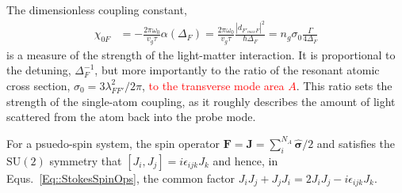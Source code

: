 \documentclass[preprint,aps,pra,onecolumn]{revtex4-1} %
\begin{document}
The dimensionless coupling constant,
\begin{align}
\chi_{0F} &= -\frac{2\pi\omega_0}{v_g\tau}\alpha(\Delta_F) =\frac{2\pi\omega_0}{v_g\tau} \frac{|d_{F'_{max}F}|^2}{\hbar \Delta_F} =n_g\sigma_0\frac{\Gamma}{4\Delta_F}
\end{align}
is a measure of the strength of the light-matter interaction.  It is proportional to the detuning, $\Delta_F^{-1}$, but more importantly to the ratio of the resonant atomic cross section, $\sigma_0 = 3 \lambda_{F F'}^2/2 \pi$, \textcolor{red}{to the transverse mode area $A$}.  This ratio sets the strength of the single-atom coupling, as it roughly describes the amount of light scattered from the atom back into the probe mode.  

For a psuedo-spin system, the spin operator 
$\mathbf{F}=\mathbf{J}=\sum_i^{N_A}\hat{\boldsymbol{\sigma}}/2$ and satisfies the $\mathrm{SU}(2)$ 
symmetry that $[J_i,J_j]=i\epsilon_{ijk}J_k$ and hence, in Equs.~\eqref{Eq::StokesSpinOps}, the common 
factor $J_iJ_j+J_jJ_i=2J_iJ_j-i\epsilon_{ijk}J_k$. 
\end{document}
